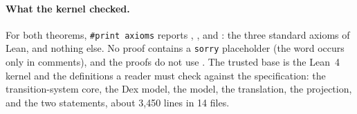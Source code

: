 \paragraph{What the kernel checked.}
For both theorems, \texttt{\#print axioms} reports
, , and : the three
standard axioms of Lean, and nothing else. No proof contains a
\texttt{sorry} placeholder (the word occurs only in comments), and the
proofs do not use . The trusted base is the
Lean~4 kernel \cite{demoura2021lean4} and the definitions a reader must
check against the specification: the transition-system core, the Dex model,
the \Lang{} model, the translation, the projection, and the two statements,
about 3,450 lines in 14 files.
